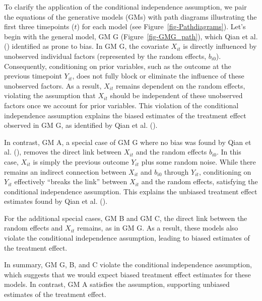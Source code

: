 \documentclass[
  11pt,
  a4paper,
]{article}
\begin{document}
To clarify the application of the conditional independence assumption,
we pair the equations of the generative models (GMs) with path diagrams
illustrating the first three timepoints (\(t\)) for each model (see
Figure~\ref{fig-Pathdiagrams}). Let's begin with the general model, GM G
(Figure~\ref{fig-GMG_path}), which Qian et al.
() identified as prone to bias. In GM G,
the covariate \(X_{it}\) is directly influenced by unobserved individual
factors (represented by the random effects, \(b_{i0}\)). Consequently,
conditioning on prior variables, such as the outcome at the previous
timepoint \(Y_{it}\), does not fully block or eliminate the influence of
these unobserved factors. As a result, \(X_{it}\) remains dependent on
the random effects, violating the assumption that \(X_{it}\) should be
independent of these unobserved factors once we account for prior
variables. This violation of the conditional independence assumption
explains the biased estimates of the treatment effect observed in GM G,
as identified by Qian et al. ().

In contrast, GM A, a special case of GM G where no bias was found by
Qian et al. (), removes the direct link
between \(X_{it}\) and the random effects \(b_{i0}\). In this case,
\(X_{it}\) is simply the previous outcome \(Y_{it}\) plus some random
noise. While there remains an indirect connection between \(X_{it}\) and
\(b_{i0}\) through \(Y_{it}\), conditioning on \(Y_{it}\) effectively
``breaks the link'' between \(X_{it}\) and the random effects,
satisfying the conditional independence assumption. This explains the
unbiased treatment effect estimates found by Qian et al.
().

For the additional special cases, GM B and GM C, the direct link between
the random effects and \(X_{it}\) remains, as in GM G. As a result,
these models also violate the conditional independence assumption,
leading to biased estimates of the treatment effect.

In summary, GM G, B, and C violate the conditional independence
assumption, which suggests that we would expect biased treatment effect
estimates for these models. In contrast, GM A satisfies the assumption,
supporting unbiased estimates of the treatment effect.
\end{document}
